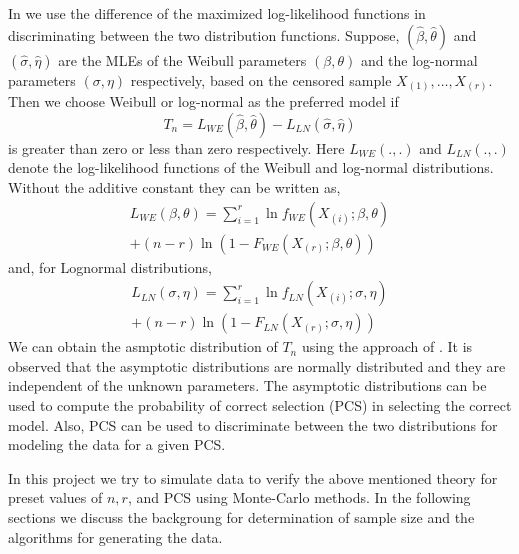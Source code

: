 \documentclass[twoside]{article}
\begin{document}
\begin{multicols}{2}
In \cite{ad09} we use the difference of the maximized log-likelihood functions in discriminating between the two distribution functions. Suppose, $(\hat{\beta},\hat{\theta})$ and $(\hat{\sigma},\hat{\eta})$ are the MLEs of the Weibull parameters $(\beta,\theta)$ and the log-normal parameters $(\sigma,\eta)$ respectively, based on the censored sample $X_{(1)},\hdots,X_{(r)}$. Then we choose Weibull or log-normal as the preferred model if
\begin{equation}
T_{n}=L_{WE}(\hat{\beta},\hat{\theta})-L_{LN}(\hat{\sigma},\hat{\eta})
\end{equation}
is greater than zero  or less than zero respectively. Here $L_{WE}(.,.)$ and $L_{LN}(.,.)$ denote the log-likelihood functions of the Weibull and log-normal distributions. Without the additive constant they can be written as,
\begin{equation}
\begin{split}
L_{WE}(\beta,\theta)=\sum_{i=1}^{r}\ln f_{WE}(X_{(i)};\beta,\theta) \\
+(n-r)\ln(1-F_{WE}(X_{(r)};\beta,\theta))
\end{split}
\end{equation}
and, for Lognormal distributions,
\begin{equation}
\begin{split}
L_{LN}(\sigma,\eta)=\sum_{i=1}^{r}\ln f_{LN}(X_{(i)};\sigma,\eta)\\
+(n-r)\ln(1-F_{LN}(X_{(r)};\sigma,\eta))
\end{split}
\end{equation}
We can obtain the asmptotic distribution of $T_n$ using the approach of \cite{b85}. It is observed that the asymptotic distributions are normally distributed and they are independent of the unknown parameters. The asymptotic distributions can be used to compute the probability of correct selection (PCS) in selecting the correct model. Also, PCS can be used to discriminate between the two distributions for modeling the data for a given PCS. 

In this project we try to simulate data to verify the above mentioned theory for preset values of $n, r$, and PCS using Monte-Carlo methods. In the following sections we discuss the backgroung for determination of sample size and the algorithms for generating the data.

\end{multicols}
\end{document}
